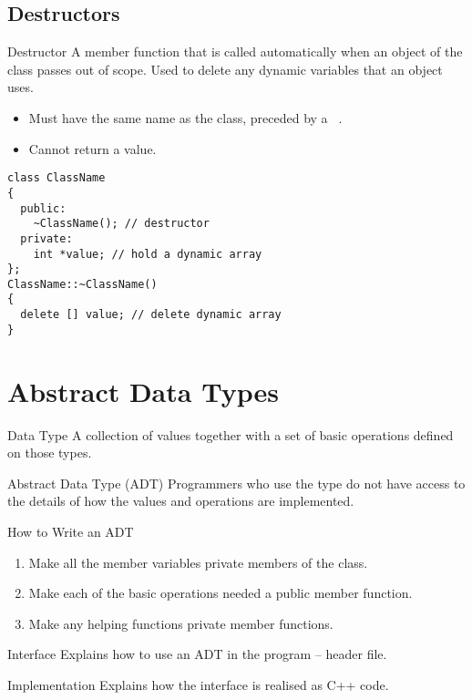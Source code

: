 \documentclass[\main/notes.tex]{subfiles}
\begin{document}
			\subsection{Destructors}
				\begin{definition}{Destructor}
					A member function that is called automatically when an object of the class passes out of scope. Used to delete any dynamic variables that an object uses.
					\begin{itemize}[nosep]
						\item Must have the same name as the class, preceded by a \texttt{~}.
						\item Cannot return a value.
					\end{itemize}
					\begin{verbatim}
class ClassName
{
  public:
    ~ClassName(); // destructor
  private:
    int *value; // hold a dynamic array
};
ClassName::~ClassName()
{
  delete [] value; // delete dynamic array
}
					\end{verbatim}
				\end{definition}

		\section{Abstract Data Types}
			\begin{definition}{Data Type}
				A collection of values together with a set of basic operations defined on those types.
			\end{definition}
			\begin{definition}{Abstract Data Type (ADT)}
				Programmers who use the type do not have access to the details of how the values and operations are implemented.
			\end{definition}
			\begin{sidenote}{How to Write an ADT}
				\begin{enumerate}[nosep]
					\item Make all the member variables private members of the class.
					\item Make each of the basic operations needed a public member function.
					\item Make any helping functions private member functions.
				\end{enumerate}
			\end{sidenote}
			\begin{sidenote}{Interface}
				Explains how to use an ADT in the program -- header file.
			\end{sidenote}
			\begin{sidenote}{Implementation}
				Explains how the interface is realised as C++ code.
			\end{sidenote}
\end{document}
